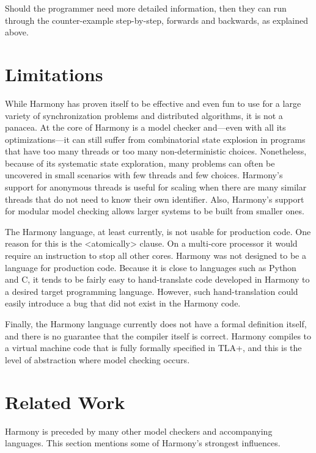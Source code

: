 \documentclass[twocolumn]{article}
\begin{document}
Should the programmer need more detailed information, then they can
run through the counter-example step-by-step, forwards and backwards,
as explained above.

\section{Limitations}

While Harmony has proven itself to be effective and even fun to use
for a large variety of synchronization problems and distributed
algorithms, it is not a panacea.  At the core of Harmony is a model
checker and---even with all its optimizations---it can still suffer
from combinatorial state explosion in programs that have too many
threads or too many non-deterministic choices.  Nonetheless, because
of its systematic state exploration, many problems can often be
uncovered in small scenarios with few threads and few choices.
Harmony's support for anonymous threads is useful for scaling when
there are many similar threads that do not need to know their own
identifier.  Also, Harmony's support for modular model checking
allows larger systems to be built from smaller ones.

The Harmony language, at least currently, is not usable for production
code.  One reason for this is the <{atomically}> clause.  On a multi-core
processor it would require an instruction to stop all other cores.
Harmony was not designed to be a language for production code.  Because
it is close to languages such as Python and C, it tends to be fairly
easy to hand-translate code developed in Harmony to a desired target
programming language.  However, such hand-translation could easily
introduce a bug that did not exist in the Harmony code.

Finally, the Harmony language currently does not have a formal definition
itself, and there is no guarantee that the compiler itself is correct.
Harmony compiles to a virtual machine code that is fully formally
specified in TLA+, and this is the level of abstraction where model
checking occurs.

\section{Related Work}

Harmony is preceded by many other model checkers and accompanying
languages.  This section mentions some of Harmony's strongest influences.
\end{document}
